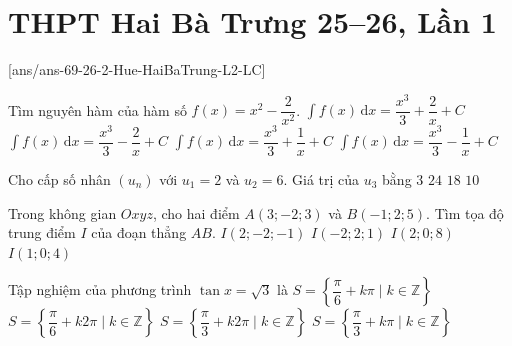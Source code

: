 \section{THPT Hai Bà Trưng 25--26, Lần 1}
\caulc
{}[ans/ans-69-26-2-Hue-HaiBaTrung-L2-LC]
\begin{ex} %
	Tìm nguyên hàm của hàm số $f(x)=x^{2}-\dfrac{2}{x^{2}}$.
	\choice
	{\True $\int f(x)\,\text{d}x=\dfrac{x^{3}}{3}+\dfrac{2}{x}+C$}
	{$\int f(x)\,\text{d}x=\dfrac{x^{3}}{3}-\dfrac{2}{x}+C$}
	{$\int f(x)\,\text{d}x=\dfrac{x^{3}}{3}+\dfrac{1}{x}+C$}
	{$\int f(x)\,\text{d}x=\dfrac{x^{3}}{3}-\dfrac{1}{x}+C$}
\end{ex}

\begin{ex} %
	Cho cấp số nhân $(u_{n})$ với $u_{1}=2$ và $u_{2}=6$. Giá trị của $u_{3}$ bằng
	\choice
	{$3$}
	{$24$}
	{\True $18$}
	{$10$}
\end{ex}

\begin{ex} %
	Trong không gian $Oxyz$, cho hai điểm $A(3;-2;3)$ và $B(-1;2;5)$. Tìm tọa độ trung điểm $I$ của đoạn thẳng $AB$.
	\choice
	{$I(2;-2;-1)$}
	{$I(-2;2;1)$}
	{$I(2;0;8)$}
	{\True $I(1;0;4)$}
\end{ex}

\begin{ex} %
	Tập nghiệm của phương trình $\tan x=\sqrt{3}$ là
	\choice
	{$S=\left\{\dfrac{\pi}{6}+k\pi \mid k\in \mathbb{Z}\right\}$}
	{$S=\left\{\dfrac{\pi}{6}+k2\pi \mid k\in \mathbb{Z}\right\}$}
	{$S=\left\{\dfrac{\pi}{3}+k2\pi \mid k\in \mathbb{Z}\right\}$}
	{\True $S=\left\{\dfrac{\pi}{3}+k\pi \mid k\in \mathbb{Z}\right\}$}
\end{ex}

